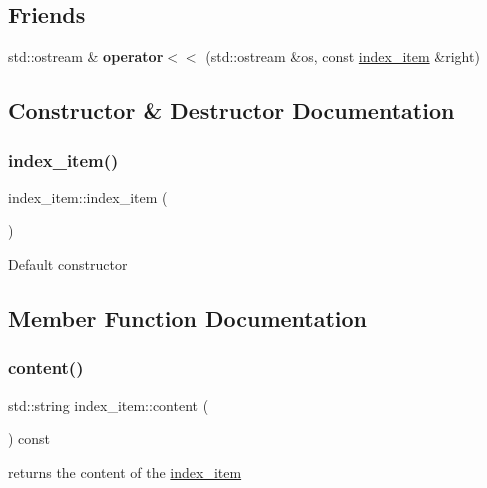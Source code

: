 \subsection*{Friends}
\begin{DoxyCompactItemize}
\item 
\mbox{\label{classindex__item_a27bd13f3db83c91ed012784e4f667822}} 
std\+::ostream \& {\bfseries operator$<$$<$} (std\+::ostream \&os, const \hyperlink{classindex__item}{index\+\_\+item} \&right)
\end{DoxyCompactItemize}


\subsection{Constructor \& Destructor Documentation}
\mbox{\label{classindex__item_a26948d7ad5975fe8160fdedb58df9904}} 
\subsubsection{\texorpdfstring{index\+\_\+item()}{index\_item()}}
{\footnotesize\ttfamily index\+\_\+item\+::index\+\_\+item (\begin{DoxyParamCaption}{ }\end{DoxyParamCaption})}

Default constructor 

\subsection{Member Function Documentation}
\mbox{\label{classindex__item_aafe86cc0ad7284d6db317588f63d1cb2}} 
\subsubsection{\texorpdfstring{content()}{content()}}
{\footnotesize\ttfamily std\+::string index\+\_\+item\+::content (\begin{DoxyParamCaption}{ }\end{DoxyParamCaption}) const}

returns the content of the \hyperlink{classindex__item}{index\+\_\+item} \mbox{\label{classindex__item_a1bcb5c577c3986549330c3aa283a6a5e}} 
